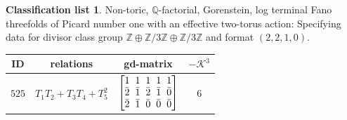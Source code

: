 \documentclass[10pt,a4paper]{amsart}
\theoremstyle{definition}
\newtheorem{class-list}[thm]{Classification list}
\def\ZZ{{\mathbb Z}}
\def\QQ{{\mathbb Q}}
\numberwithin{equation}{section}
\begin{document}
\begin{class-list}\label{class-list(0,3,3)}
Non-toric, $\QQ$-factorial, Gorenstein, log terminal Fano
threefolds of Picard number one with an effective two-torus action:
Specifying data for divisor class group
$\ZZ\oplus \ZZ/3\ZZ\oplus \ZZ/3\ZZ$ and format $(2,2,1,0)$.
\begin{table}[h!]\centering\setlength{\tabcolsep}{5.5pt}
\renewcommand{\arraystretch}{1.35}\small\tabulinesep=1mm
\begin{tabu}{c|c|c|c}
\hline
ID&relations&gd-matrix&$-\mathcal{K}^3$
\\
\hline
${525}$&${T_{1}T_{2}+T_{3}T_{4}+T_{5}^{2}}$
&$\arraycolsep=1mm\begin{bmatrix}{1} & {1} & {1} & {1} & {1} \\ {\bar{2}} & {\bar{1}} & {\bar{2}} & {\bar{1}} & {\bar{0}} \\ {\bar{2}} & {\bar{1}} & {\bar{0}} & {\bar{0}} & {\bar{0}}\end{bmatrix}$
&${6}$
\\
\hline
\end{tabu}\vspace{4mm}
\end{table}
\end{class-list}
\end{document}
